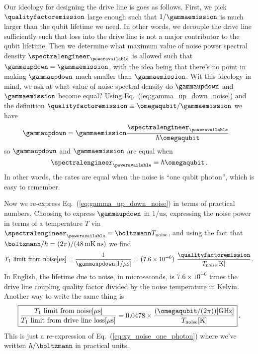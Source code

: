 Our ideology for designing the drive line is goes as follows.
First, we pick $\qualityfactoremission$ large enough such that $1 / \gammaemission$ is much larger than the qubit lifetime we need.
In other words, we decouple the drive line sufficiently such that loss into the drive line is not a major contributor to the qubit lifetime.
Then we determine what maximum value of noise power spectral density $\spectralengineer_{\poweravailable}$ is allowed such that $\gammaupdown = \gammaemission$, with the idea being that there's no point in making $\gammaupdown$ much smaller than $\gammaemission$.
Wit this ideology in mind, we ask at what value of noise spectral density do $\gammaupdown$ and $\gammaemission$ become equal?
Using Eq.~(\ref{eq:gamma_up_down_noise}) and the definition $\qualityfactoremission \equiv \omegaqubit / \gammaemission$ we have
\begin{align}
    \gammaupdown
    &= \gammaemission \frac{\spectralengineer_{\poweravailable}}{\hbar \omegaqubit} \nonumber
\end{align}
so $\gammaupdown$ and $\gammaemission$ are equal when
\begin{equation}
    \spectralengineer_{\poweravailable} = \hbar \omegaqubit \, . \label{eq:xy_noise_one_photon}
\end{equation}
In other words, the rates are equal when the noise is ``one qubit photon'', which is easy to remember.

Now we re-express Eq.~(\ref{eq:gamma_up_down_noise}) in terms of practical numbers.
Choosing to express $\gammaupdown$ in $1/\text{us}$, expressing the noise power in terms of a temperature $T$ via $\spectralengineer_{\poweravailable} = \boltzmann T_\text{noise}$, and using the fact that $\boltzmann / \hbar = (2 \pi) / (48\,\text{mK} \, \text{ns})$ we find
\begin{equation}
  T_1\text{ limit from noise}[\mu \text{s}] = \frac{1}{\gammaupdown[1 / \mu \text{s}]}
  = \left( 7.6 \times 10^{-6} \right) \, \frac{\qualityfactoremission}{T_\text{noise}[\text{K}]} \, .
\end{equation}
In English, the lifetime due to noise, in microseconds, is $7.6 \times 10^{-6}$ times the drive line coupling quality factor divided by the noise temperature in Kelvin.
Another way to write the same thing is
\begin{equation}
  \boxed{
    \frac{T_1 \text{ limit from noise}[\mu \text{s}]}{T_1 \text{ limit from drive line loss}[\mu \text{s}]} = 0.0478 \times \frac{(\omegaqubit / (2\pi))[\text{GHz]}}{T_\text{noise}[\text{K}]} \label{eq:T1_ratio_rule}
   }
   \, .
\end{equation}
This is just a re-expression of Eq.~(\ref{eq:xy_noise_one_photon}) where we've written $\hbar / \boltzmann$ in practical units.

